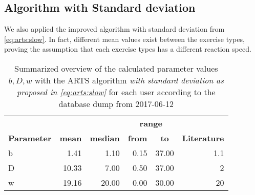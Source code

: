 \documentclass{article}
\begin{document}
\subsection{Algorithm with Standard deviation}
We also applied the improved algorithm with standard deviation from \autoref{eq:arts:slow}. In fact, different mean values exist between the exercise types, proving the assumption that each exercise types has a different reaction speed.

\begin{table}[H]
\centering
\begin{tabular}{lrrrr|r}
\multicolumn{1}{c}{\textbf{}}          & \multicolumn{1}{c}{\textbf{}}     & \multicolumn{1}{c}{\textbf{}}       & \multicolumn{2}{c}{\textbf{range}}                                  & \multicolumn{1}{c}{\textbf{}} \\
\multicolumn{1}{c}{\textbf{Parameter}} & \multicolumn{1}{c}{\textbf{mean}} & \multicolumn{1}{c}{\textbf{median}} & \multicolumn{1}{c}{\textbf{from}} & \multicolumn{1}{c}{\textbf{to}} & \multicolumn{1}{c}{\textbf{Literature}} \\
b                                      & 1.41                              & 1.10                                & 0.15                              & 37.00                           & 1.1 \\
D                                      & 10.33                              & 7.00                               & 0.50                              & 37.00                           & 2 \\
w                                      & 19.16                             & 20.00                               & 0.00                              & 30.00                           & 20 \\
\end{tabular}
\caption{Summarized overview of the calculated parameter values $b, D, w$ with the ARTS algorithm \textit{with standard deviation as proposed in \autoref{eq:arts:slow}}  for each user according to the database dump from 2017-06-12}
\label{table:artsstd:results}
\end{table}
\end{document}
